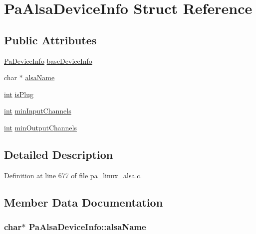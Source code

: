 \hypertarget{struct_pa_alsa_device_info}{}\section{Pa\+Alsa\+Device\+Info Struct Reference}
\label{struct_pa_alsa_device_info}
\subsection*{Public Attributes}
\begin{DoxyCompactItemize}
\item 
\hyperlink{struct_pa_device_info}{Pa\+Device\+Info} \hyperlink{struct_pa_alsa_device_info_a5f17f8aeda7b7e7e041006edacf9d3dc}{base\+Device\+Info}
\item 
char $\ast$ \hyperlink{struct_pa_alsa_device_info_a09959f7709fe9ba29a4e3fd902fd0880}{alsa\+Name}
\item 
\hyperlink{xmltok_8h_a5a0d4a5641ce434f1d23533f2b2e6653}{int} \hyperlink{struct_pa_alsa_device_info_a9b00b3189ea32b6635ef2bfdc2938b81}{is\+Plug}
\item 
\hyperlink{xmltok_8h_a5a0d4a5641ce434f1d23533f2b2e6653}{int} \hyperlink{struct_pa_alsa_device_info_a6209baa598eb9503aabf531309cc217d}{min\+Input\+Channels}
\item 
\hyperlink{xmltok_8h_a5a0d4a5641ce434f1d23533f2b2e6653}{int} \hyperlink{struct_pa_alsa_device_info_a2ce67b50d5ac9bfe1ed3210694e580ab}{min\+Output\+Channels}
\end{DoxyCompactItemize}


\subsection{Detailed Description}


Definition at line 677 of file pa\+\_\+linux\+\_\+alsa.\+c.



\subsection{Member Data Documentation}
\subsubsection[{\texorpdfstring{alsa\+Name}{alsaName}}]{\setlength{\rightskip}{0pt plus 5cm}char$\ast$ Pa\+Alsa\+Device\+Info\+::alsa\+Name}\hypertarget{struct_pa_alsa_device_info_a09959f7709fe9ba29a4e3fd902fd0880}{}\label{struct_pa_alsa_device_info_a09959f7709fe9ba29a4e3fd902fd0880}


